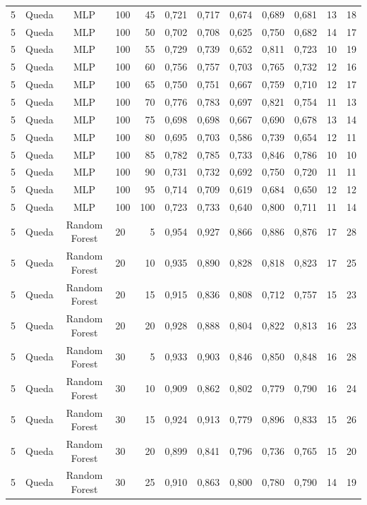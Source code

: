 \begin{longtable}{ccclrrrrrrrr}
5 & Queda & MLP & 100 & 45 & 0,721 & 0,717 & 0,674 & 0,689 & 0,681 & 13 & 18 \\
5 & Queda & MLP & 100 & 50 & 0,702 & 0,708 & 0,625 & 0,750 & 0,682 & 14 & 17 \\
5 & Queda & MLP & 100 & 55 & 0,729 & 0,739 & 0,652 & 0,811 & 0,723 & 10 & 19 \\
5 & Queda & MLP & 100 & 60 & 0,756 & 0,757 & 0,703 & 0,765 & 0,732 & 12 & 16 \\
5 & Queda & MLP & 100 & 65 & 0,750 & 0,751 & 0,667 & 0,759 & 0,710 & 12 & 17 \\
5 & Queda & MLP & 100 & 70 & 0,776 & 0,783 & 0,697 & 0,821 & 0,754 & 11 & 13 \\
5 & Queda & MLP & 100 & 75 & 0,698 & 0,698 & 0,667 & 0,690 & 0,678 & 13 & 14 \\
5 & Queda & MLP & 100 & 80 & 0,695 & 0,703 & 0,586 & 0,739 & 0,654 & 12 & 11 \\
5 & Queda & MLP & 100 & 85 & 0,782 & 0,785 & 0,733 & 0,846 & 0,786 & 10 & 10 \\
5 & Queda & MLP & 100 & 90 & 0,731 & 0,732 & 0,692 & 0,750 & 0,720 & 11 & 11 \\
5 & Queda & MLP & 100 & 95 & 0,714 & 0,709 & 0,619 & 0,684 & 0,650 & 12 & 12 \\
5 & Queda & MLP & 100 & 100 & 0,723 & 0,733 & 0,640 & 0,800 & 0,711 & 11 & 14 \\
5 & Queda & Random Forest & 20 & 5 & 0,954 & 0,927 & 0,866 & 0,886 & 0,876 & 17 & 28 \\
5 & Queda & Random Forest & 20 & 10 & 0,935 & 0,890 & 0,828 & 0,818 & 0,823 & 17 & 25 \\
5 & Queda & Random Forest & 20 & 15 & 0,915 & 0,836 & 0,808 & 0,712 & 0,757 & 15 & 23 \\
5 & Queda & Random Forest & 20 & 20 & 0,928 & 0,888 & 0,804 & 0,822 & 0,813 & 16 & 23 \\
5 & Queda & Random Forest & 30 & 5 & 0,933 & 0,903 & 0,846 & 0,850 & 0,848 & 16 & 28 \\
5 & Queda & Random Forest & 30 & 10 & 0,909 & 0,862 & 0,802 & 0,779 & 0,790 & 16 & 24 \\
5 & Queda & Random Forest & 30 & 15 & 0,924 & 0,913 & 0,779 & 0,896 & 0,833 & 15 & 26 \\
5 & Queda & Random Forest & 30 & 20 & 0,899 & 0,841 & 0,796 & 0,736 & 0,765 & 15 & 20 \\
5 & Queda & Random Forest & 30 & 25 & 0,910 & 0,863 & 0,800 & 0,780 & 0,790 & 14 & 19 \\

\end{longtable}
